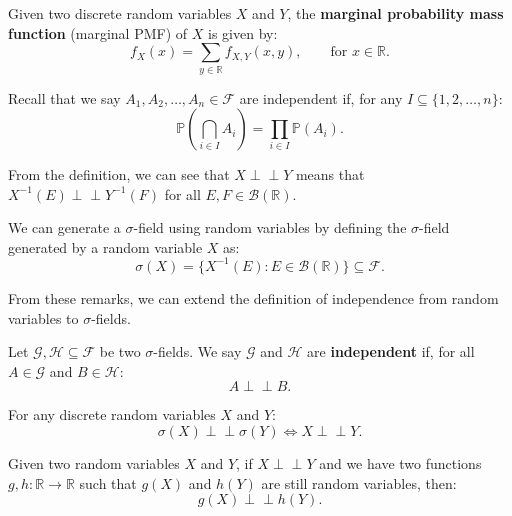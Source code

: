 \documentclass{huhtakm-template-book-v2}
\newcommand{\independent}{\perp\!\!\!\perp}
\newcommand{\prob}{\mathbb{P}}
\begin{document}
    \begin{defn}
        Given two discrete random variables $X$ and $Y$, the \textbf{marginal probability mass function} (marginal PMF) of $X$ is given by:
        \begin{equation*}
            f_{X}(x) = \sum_{y \in \mathbb{R}}f_{X,Y}(x, y), \qquad\text{for }x \in \mathbb{R}.
        \end{equation*}
    \end{defn}
    Recall that we say $A_{1},A_{2},\dots,A_{n} \in \mathcal{F}$ are independent if, for any $I\subseteq\{1,2,\dots,n\}$:
    \begin{equation*}
        \prob\left(\bigcap_{i \in I}A_{i}\right) = \prod_{i \in I}\prob(A_{i}).
    \end{equation*}
    \begin{rem}
        From the definition, we can see that $X \independent Y$ means that $X^{-1}(E) \independent Y^{-1}(F)$ for all $E,F \in \mathcal{B}(\mathbb{R})$.
    \end{rem}
    \begin{rem}
        We can generate a $\sigma$-field using random variables by defining the $\sigma$-field generated by a random variable $X$ as:
        \begin{equation*}
            \sigma(X) = \{X^{-1}(E):E \in \mathcal{B}(\mathbb{R})\}\subseteq\mathcal{F}.
        \end{equation*}
    \end{rem}
    From these remarks, we can extend the definition of independence from random variables to $\sigma$-fields.
    \begin{defn}
        Let $\mathcal{G},\mathcal{H}\subseteq\mathcal{F}$ be two $\sigma$-fields. We say $\mathcal{G}$ and $\mathcal{H}$ are \textbf{independent} if, for all $A \in \mathcal{G}$ and $B \in \mathcal{H}$:
        \begin{equation*}
            A \independent B.
        \end{equation*}
    \end{defn}
    \begin{rem}
        For any discrete random variables $X$ and $Y$:
        \begin{equation*}
            \sigma(X) \independent \sigma(Y) \iff X \independent Y.
        \end{equation*}
    \end{rem}
    \begin{thm}
        Given two random variables $X$ and $Y$, if $X \independent Y$ and we have two functions $g,h:\mathbb{R} \to \mathbb{R}$ such that $g(X)$ and $h(Y)$ are still random variables, then:
        \begin{equation*}
            g(X) \independent h(Y).
        \end{equation*}
    \end{thm}
\end{document}
